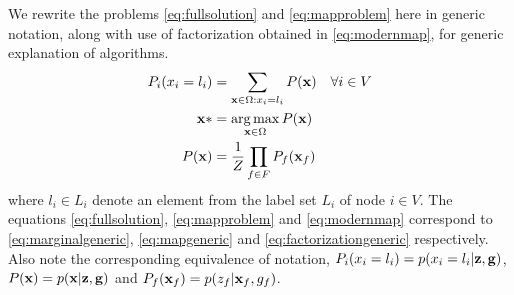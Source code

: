 \documentclass[letterpaper, 10 pt, conference]{ieeeconf} %
\DeclareMathOperator*{\argmax}{arg\,max}
\newcommand{\field}[1]{\mathbb{#1}}
\newcommand{\Real}[0]{\field{R}}
\begin{document}

We rewrite the problems \eqref{eq:fullsolution} and \eqref{eq:mapproblem} here
in generic notation, along with use of factorization obtained in
\eqref{eq:modernmap}, for generic explanation of algorithms.
\begin{align}
  P_i(x_i = l_i) &= \sum_{\map \in \Omega : x_i = l_i} P(\map) & \forall i \in V
  \label{eq:marginalgeneric}
  \\
     \map* &= \argmax_{\map \in \Omega} P(\map)
  \label{eq:mapgeneric}
  \\
   P(\map) &= \frac{1}{Z}\prod_{f \in F} P_f(\map_f)
  \label{eq:factorizationgeneric}
\end{align}
where  $l_i \in L_i$ denote an element from the label set $L_i$ of node $i \in V$.
The equations \eqref{eq:fullsolution}, \eqref{eq:mapproblem} and
\eqref{eq:modernmap} correspond to \eqref{eq:marginalgeneric},
\eqref{eq:mapgeneric} and \eqref{eq:factorizationgeneric} respectively. Also
note the corresponding equivalence of notation, $P_i(x_i = l_i) = p(x_i = l_i|\mathbf{z}, \mathbf{g})$, $P(\mathbf{x}) = p(\mathbf{x}|\mathbf{z}, \mathbf{g})$ and $P_f(\mathbf{x}_f) = p(z_f|\mathbf{x}_f, g_f)$.
\end{document}
